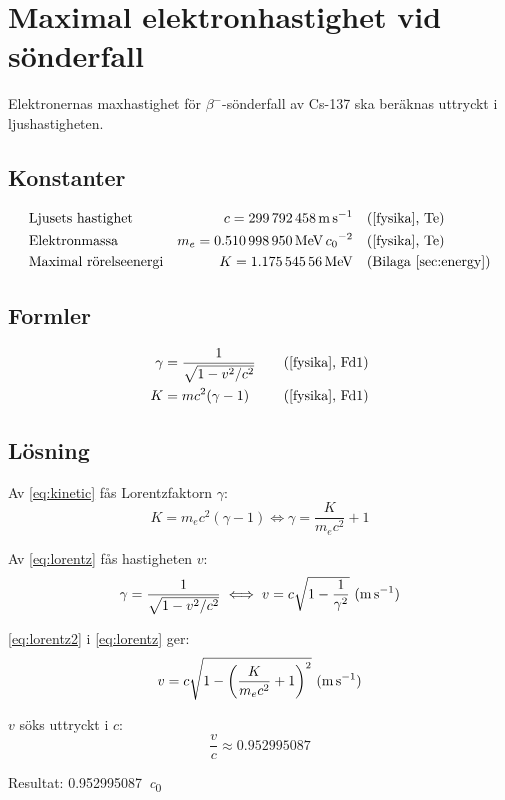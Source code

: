 \section{Maximal elektronhastighet vid sönderfall} \label{sec:speed}

Elektronernas maxhastighet för $\beta^-$-sönderfall av Cs-137 ska beräknas
uttryckt i ljushastigheten.

\subsection*{Konstanter}

\begin{align*}
    & \text{Ljusets hastighet}     & c   = \qty{299792458}{\m\per\s}                  &\quad \fysika{Te}                      \\
    & \text{Elektronmassa}         & m_e = \qty{0.510998950}{\MeV\per\clight\squared} &\quad \fysika{Te}                      \\
    & \text{Maximal rörelseenergi} & K   = \qty{1.17554556}{\MeV}                     &\quad \text{(Bilaga~\ref{sec:energy})}
\end{align*}

\subsection*{Formler}

\begin{align}
    \gamma &= \frac{1}{\sqrt{1 - v^2/c^2}} &\quad \fysika{Fd1} \label{eq:lorentz} \\
         K &= mc^2(\gamma - 1)             &\quad \fysika{Fd1} \label{eq:kinetic}
\end{align}

\subsection*{Lösning}

Av \eqref{eq:kinetic} fås Lorentzfaktorn $\gamma$:
%
\begin{equation}
    K = m_e c^2(\gamma - 1) \iff \gamma = \frac{K}{m_e c^2} + 1 \label{eq:lorentz2}
\end{equation}

Av \eqref{eq:lorentz} fås hastigheten $v$:
%
\begin{equation}
    \gamma = \frac{1}{\sqrt{1 - v^2/c^2}} \iff v = c \sqrt{1 - \frac{1}{\gamma^2}} \inlineunit{\m\per\s} \label{eq:speed}
\end{equation}

\eqref{eq:lorentz2} i \eqref{eq:lorentz} ger:
%
\begin{equation}
    v = c \sqrt{1 - \left( \frac{K}{m_e c^2} + 1 \right)^2} \inlineunit{\m\per\s}
\end{equation}

$v$ söks uttryckt i $c$:
%
\begin{equation}
    \frac{v}{c} \approx \num{0.952995087}
\end{equation}

Resultat: \qty{0.952995087}{\clight}
